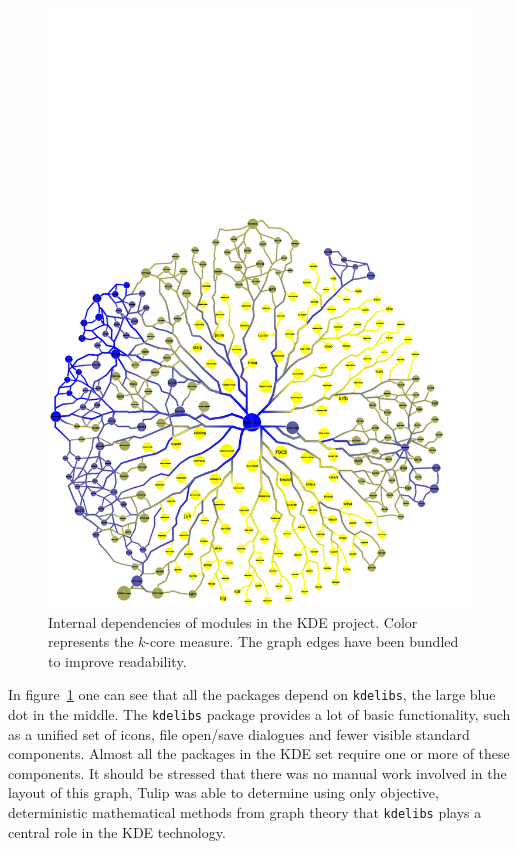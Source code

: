 \documentclass[smallextended,final]{svjour3}
\begin{document}
\begin{figure}
\small\centering
\includegraphics[clip,trim=0 0 1cm 10cm,width=\linewidth]{kde.pdf}
\caption{Internal dependencies of modules in the KDE project. Color represents the $k$-core measure. The graph edges have been bundled to improve readability.}\label{fig:kde2}
\end{figure}

In figure~\ref{fig:kde2} one can see that all the packages depend on \verb|kdelibs|, the large blue dot in the middle. The \verb|kdelibs| package provides a lot of basic functionality, such as a unified set of icons, file open/save dialogues and fewer visible standard components. Almost all the packages in the KDE set require one or more of these components. It should be stressed that there was no manual work involved in the layout of this graph, Tulip was able to determine using only objective, deterministic mathematical methods from graph theory that \verb|kdelibs| plays a central role in the KDE technology.
\end{document}

